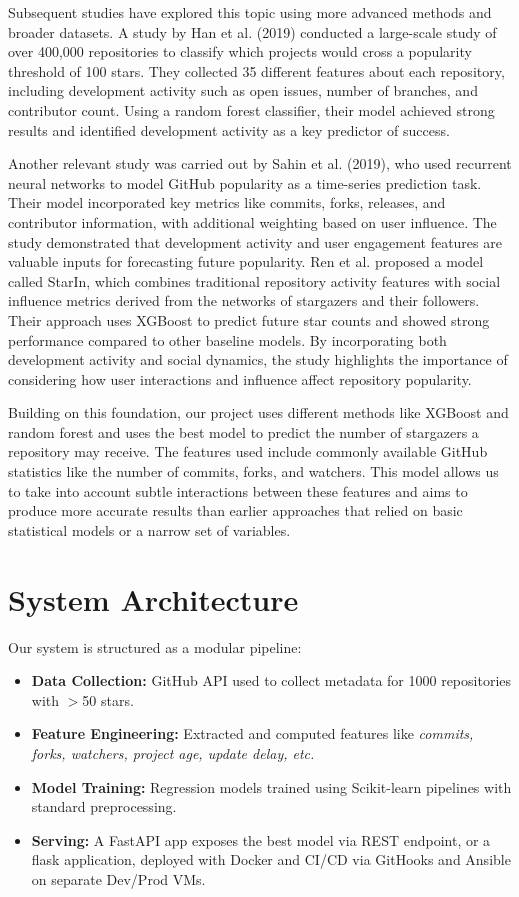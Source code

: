 \documentclass[12pt,a4paper]{article}
\begin{document}
Subsequent studies have explored this topic using more advanced methods and broader datasets. A study by Han et al. (2019) conducted a large-scale study of over 400,000 repositories to classify which projects would cross a popularity threshold of 100 stars. They collected 35 different features about each repository, including development activity such as open issues, number of branches, and contributor count. Using a random forest classifier, their model achieved strong results and identified development activity as a key predictor of success.\cite{1}  

Another relevant study was carried out by Sahin et al. (2019),\cite{4} who used recurrent neural networks to model GitHub popularity as a time-series prediction task. Their model incorporated key metrics like commits, forks, releases, and contributor information, with additional weighting based on user influence. The study demonstrated that development activity and user engagement features are valuable inputs for forecasting future popularity. Ren et al.\cite{2} proposed a model called StarIn, which combines traditional repository activity features with social influence metrics derived from the networks of stargazers and their followers. Their approach uses XGBoost to predict future star counts and showed strong performance compared to other baseline models. By incorporating both development activity and social dynamics, the study highlights the importance of considering how user interactions and influence affect repository popularity.

Building on this foundation, our project uses different methods like XGBoost and random forest and uses the best model to predict the number of stargazers a repository may receive. The features used include commonly available GitHub statistics like the number of commits, forks, and watchers. This model allows us to take into account subtle interactions between these features and aims to produce more accurate results than earlier approaches that relied on basic statistical models or a narrow set of variables.

\section{System Architecture}
Our system is structured as a modular pipeline:
\begin{itemize}
    \item \textbf{Data Collection:} GitHub API used to collect metadata for 1000 repositories with $>$50 stars.
    \item \textbf{Feature Engineering:} Extracted and computed features like \textit{commits, forks, watchers, project age, update delay, etc.}
    \item \textbf{Model Training:} Regression models trained using Scikit-learn pipelines with standard preprocessing.
    \item \textbf{Serving:} A FastAPI app exposes the best model via REST endpoint, or a flask application, deployed with Docker and CI/CD via GitHooks and Ansible on separate Dev/Prod VMs.
\end{itemize}
\end{document}
